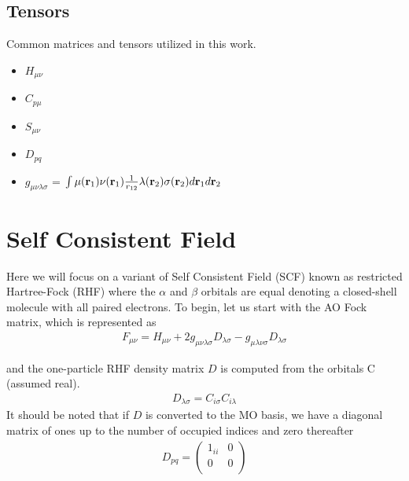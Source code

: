 \documentclass[aip,jcp,preprint,superscriptaddress,floatfix]{revtex4-1}
\begin{document}
\subsection{Tensors}
Common matrices and tensors utilized in this work. 
\begin{itemize} \itemsep1pt \parskip0pt 
\item {}   $H_{\mu\nu}$
\item {}   $C_{p\mu}$
\item {}   $S_{\mu\nu}$
\item {}   $D_{pq}$
\item {}    $g_{\mu\nu\lambda \sigma}$ =  $\int \mu({\bf r}_1) \nu({\bf r}_1)\frac{1}{r_{12}} \lambda({\bf r}_2) \sigma({\bf r}_2)d{\bf r}_1d{\bf r}_2$
\end{itemize}

\section{Self Consistent Field}
Here we will focus on a variant of Self Consistent Field (SCF) known as restricted Hartree-Fock (RHF) where the $\alpha$ and $\beta$ orbitals are equal denoting a closed-shell molecule with all paired electrons.
To begin, let us start with the AO Fock matrix, which is represented as\cite{Szabo:1996tu, Levine:2000to}
\begin{eqnarray}
\label{rhf_fock}
F_{\mu\nu} = H_{\mu\nu} + 2 g_{\mu \nu \lambda \sigma} D_{\lambda \sigma} -  g_{\mu\lambda \nu \sigma} D_{\lambda \sigma}
\end{eqnarray}

and the one-particle RHF density matrix $D$ is computed from the orbitals C (assumed real).
\begin{eqnarray}
D_{\lambda \sigma} = C_{i\sigma}C_{i\lambda}
\end{eqnarray}
It should be noted that if $D$ is converted to the MO basis, we have a diagonal matrix of ones up to the number of occupied indices and zero thereafter
\begin{align}
D_{pq} = \begin{pmatrix}
1_{ii}& 0 \\
0 &0\\
\end{pmatrix}
\end{align}
\end{document}
